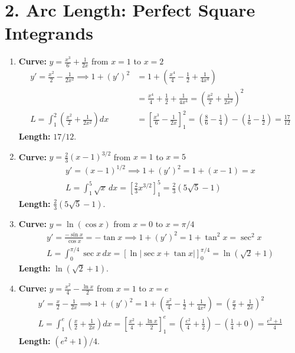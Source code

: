 \documentclass[12pt]{article}
\newcommand{\problemsettitle}[1]{\section*{#1}}
\begin{document}
\newpage
\problemsettitle{2. Arc Length: Perfect Square Integrands}
\begin{enumerate}
    \item \textbf{Curve:} $y = \frac{x^3}{6} + \frac{1}{2x}$ from $x=1$ to $x=2$
    \begin{align*}
        y' = \frac{x^2}{2} - \frac{1}{2x^2} \implies 1+(y')^2 &= 1 + \left(\frac{x^4}{4} - \frac{1}{2} + \frac{1}{4x^4}\right) \\
        &= \frac{x^4}{4} + \frac{1}{2} + \frac{1}{4x^4} = \left(\frac{x^2}{2} + \frac{1}{2x^2}\right)^2 \\
        L = \int_1^2 \left(\frac{x^2}{2} + \frac{1}{2x^2}\right) dx &= \left[\frac{x^3}{6} - \frac{1}{2x}\right]_1^2 = (\frac{8}{6}-\frac{1}{4}) - (\frac{1}{6}-\frac{1}{2}) = \frac{17}{12}
    \end{align*}
    \textbf{Length:} $17/12$.

    \item \textbf{Curve:} $y = \frac{2}{3}(x-1)^{3/2}$ from $x=1$ to $x=5$
    \begin{align*}
        y' = (x-1)^{1/2} \implies 1+(y')^2 = 1 + (x-1) = x \\
        L = \int_1^5 \sqrt{x} \,dx = \left[\frac{2}{3}x^{3/2}\right]_1^5 = \frac{2}{3}(5\sqrt{5} - 1)
    \end{align*}
    \textbf{Length:} $\frac{2}{3}(5\sqrt{5} - 1)$.

    \item \textbf{Curve:} $y = \ln(\cos x)$ from $x=0$ to $x=\pi/4$
    \begin{align*}
        y' = \frac{-\sin x}{\cos x} = -\tan x \implies 1+(y')^2 = 1+\tan^2 x = \sec^2 x \\
        L = \int_0^{\pi/4} \sec x \,dx = [\ln|\sec x + \tan x|]_0^{\pi/4} = \ln(\sqrt{2}+1)
    \end{align*}
    \textbf{Length:} $\ln(\sqrt{2}+1)$.

    \item \textbf{Curve:} $y = \frac{x^2}{4} - \frac{\ln x}{2}$ from $x=1$ to $x=e$
    \begin{align*}
        y' = \frac{x}{2} - \frac{1}{2x} \implies 1+(y')^2 = 1 + (\frac{x^2}{4} - \frac{1}{2} + \frac{1}{4x^2}) = (\frac{x}{2} + \frac{1}{2x})^2 \\
        L = \int_1^e (\frac{x}{2} + \frac{1}{2x}) dx = \left[\frac{x^2}{4} + \frac{\ln x}{2}\right]_1^e = (\frac{e^2}{4}+\frac{1}{2}) - (\frac{1}{4}+0) = \frac{e^2+1}{4}
    \end{align*}
    \textbf{Length:} $(e^2+1)/4$.


\end{enumerate}
\end{document}
